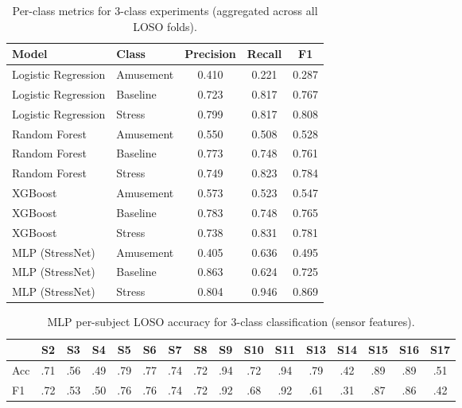 \documentclass[11pt]{article}
\begin{document}
\begin{table}[H]
\centering
\caption{Per-class metrics for 3-class experiments (aggregated across all LOSO folds).}
\label{tab:3class-perclass}
\begin{tabular}{llccc}
\toprule
\textbf{Model} & \textbf{Class} & \textbf{Precision} & \textbf{Recall} & \textbf{F1} \\
\midrule
Logistic Regression & Amusement & 0.410 & 0.221 & 0.287 \\
Logistic Regression & Baseline  & 0.723 & 0.817 & 0.767 \\
Logistic Regression & Stress    & 0.799 & 0.817 & 0.808 \\
\midrule
Random Forest       & Amusement & 0.550 & 0.508 & 0.528 \\
Random Forest       & Baseline  & 0.773 & 0.748 & 0.761 \\
Random Forest       & Stress    & 0.749 & 0.823 & 0.784 \\
\midrule
XGBoost             & Amusement & 0.573 & 0.523 & 0.547 \\
XGBoost             & Baseline  & 0.783 & 0.748 & 0.765 \\
XGBoost             & Stress    & 0.738 & 0.831 & 0.781 \\
\midrule
MLP (StressNet)     & Amusement & 0.405 & 0.636 & 0.495 \\
MLP (StressNet)     & Baseline  & 0.863 & 0.624 & 0.725 \\
MLP (StressNet)     & Stress    & 0.804 & 0.946 & 0.869 \\
\bottomrule
\end{tabular}
\end{table}

\begin{table}[H]
\centering
\caption{MLP per-subject LOSO accuracy for 3-class classification (sensor features).}
\label{tab:mlp-persub-3class}
\small
\begin{tabular}{lccccccccccccccc}
\toprule
& S2 & S3 & S4 & S5 & S6 & S7 & S8 & S9 & S10 & S11 & S13 & S14 & S15 & S16 & S17 \\
\midrule
Acc & .71 & .56 & .49 & .79 & .77 & .74 & .72 & .94 & .72 & .94 & .79 & .42 & .89 & .89 & .51 \\
F1  & .72 & .53 & .50 & .76 & .76 & .74 & .72 & .92 & .68 & .92 & .61 & .31 & .87 & .86 & .42 \\
\bottomrule
\end{tabular}
\end{table}
\end{document}
